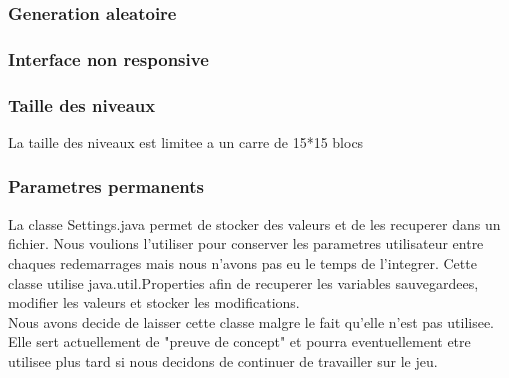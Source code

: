 \documentclass[../main.tex]{subfiles}
\begin{document}
\subsubsection{Generation aleatoire}
\subsubsection{Interface non responsive}
\subsubsection{Taille des niveaux}
La taille des niveaux est limitee a un carre de 15*15 blocs

\subsubsection{Parametres permanents}
La classe Settings.java permet de stocker des valeurs et de les recuperer dans un fichier. Nous voulions l'utiliser pour conserver les parametres utilisateur entre chaques redemarrages mais nous n'avons pas eu le temps de l'integrer. Cette classe utilise java.util.Properties afin de recuperer les variables sauvegardees, modifier les valeurs et stocker les modifications. \\

Nous avons decide de laisser cette classe malgre le fait qu'elle n'est pas utilisee. Elle sert actuellement de "preuve de concept" et pourra eventuellement etre utilisee plus tard si nous decidons de continuer de travailler sur le jeu.
\end{document}
